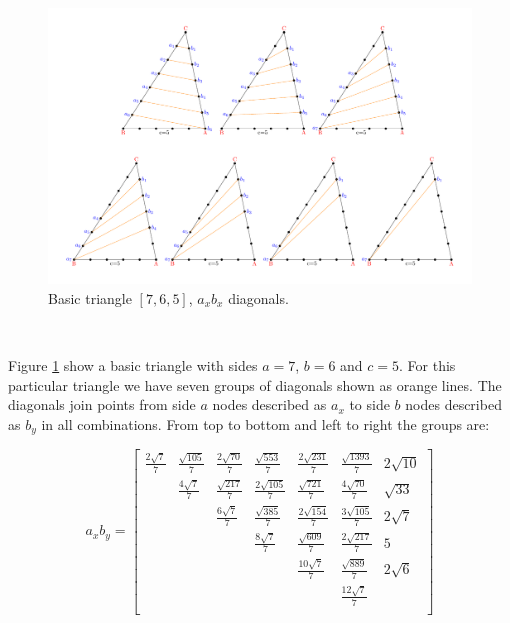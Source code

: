 \documentclass[11pt]{article}
\begin{document}
\begin{figure}[htp]
\centering
\includegraphics[scale=0.65]{t765}
\caption{Basic triangle $[7,6,5]$, $a_xb_x$ diagonals.}
\label{t765}
\end{figure}
\



Figure \ref{t765} show a basic triangle with sides $a=7$, $b=6$ and $c=5$. For this particular triangle we have seven groups of diagonals shown as orange lines. The diagonals join points from side $a$ nodes described as $a_x$ to side $b$ nodes described as $b_y$ in all combinations. From top to bottom and left to right the groups are:

\[
a_xb_y = \begin{bmatrix}
	\frac{2\sqrt7}7 & \frac{\sqrt{105}}7 & \frac{2\sqrt{70}}7 & \frac{\sqrt{553}}7 & \frac{2\sqrt{231}}7 & \frac{\sqrt{1393}}7 & 2\sqrt{10} \\
	 & \frac{4\sqrt7}7 & \frac{\sqrt{217}}7 & \frac{2\sqrt{105}}7 & \frac{\sqrt{721}}7 & \frac{4\sqrt{70}}7 & \sqrt{33} \\
	 & & \frac{6\sqrt7}7 & \frac{\sqrt{385}}7 & \frac{2\sqrt{154}}7 & \frac{3\sqrt{105}}7 & 2\sqrt{7} \\
	 & & & \frac{8\sqrt7}7 & \frac{\sqrt{609}}7 & \frac{2\sqrt{217}}7 & 5 \\
	 & & & & \frac{10\sqrt7}7 & \frac{\sqrt{889}}7 & 2\sqrt{6} \\
	 & & & & & \frac{12\sqrt7}7 \\
\end{bmatrix}
\]
\end{document}

